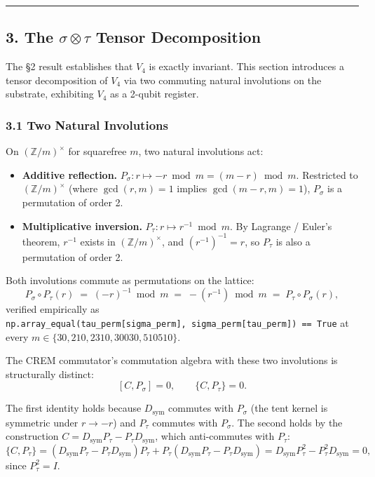 \documentclass[
]{article}
\providecommand{\tightlist}{%
  \setlength{\itemsep}{0pt}\setlength{\parskip}{0pt}}
\begin{document}
\begin{center}\rule{0.5\linewidth}{0.5pt}\end{center}

\subsection{\texorpdfstring{3. The \(\sigma\otimes\tau\) Tensor
Decomposition}{3. The \textbackslash sigma\textbackslash otimes\textbackslash tau Tensor Decomposition}}\label{the-sigmaotimestau-tensor-decomposition}

The §2 result establishes that \(V_4\) is exactly invariant. This
section introduces a tensor decomposition of \(V_4\) via two commuting
natural involutions on the substrate, exhibiting \(V_4\) as a 2-qubit
register.

\subsubsection{3.1 Two Natural
Involutions}\label{two-natural-involutions}

On \((\mathbb{Z}/m)^\times\) for squarefree \(m\), two natural
involutions act:

\begin{itemize}
\tightlist
\item
  \textbf{Additive reflection.}
  \(P_\sigma : r \mapsto -r \bmod m = (m - r) \bmod m\). Restricted to
  \((\mathbb{Z}/m)^\times\) (where \(\gcd(r, m) = 1\) implies
  \(\gcd(m-r, m) = 1\)), \(P_\sigma\) is a permutation of order 2.
\item
  \textbf{Multiplicative inversion.}
  \(P_\tau : r \mapsto r^{-1} \bmod m\). By Lagrange / Euler's theorem,
  \(r^{-1}\) exists in \((\mathbb{Z}/m)^\times\), and
  \((r^{-1})^{-1} = r\), so \(P_\tau\) is also a permutation of order 2.
\end{itemize}

Both involutions commute as permutations on the lattice:
\[P_\sigma \circ P_\tau (r) \;=\; (-r)^{-1} \bmod m \;=\; -(r^{-1}) \bmod m \;=\; P_\tau \circ P_\sigma (r), \tag{3.1}\]
verified empirically as
\texttt{np.array\_equal(tau\_perm{[}sigma\_perm{]},\ sigma\_perm{[}tau\_perm{]})\ ==\ True}
at every \(m \in \{30, 210, 2310, 30030, 510510\}\).

The CREM commutator's commutation algebra with these two involutions is
structurally distinct:
\[[C, P_\sigma] = 0, \qquad \{C, P_\tau\} = 0. \tag{3.2}\]

The first identity holds because \(D_\text{sym}\) commutes with
\(P_\sigma\) (the tent kernel is symmetric under \(r \to -r\)) and
\(P_\tau\) commutes with \(P_\sigma\). The second holds by the
construction \(C = D_\text{sym} P_\tau - P_\tau D_\text{sym}\), which
anti-commutes with \(P_\tau\):
\[\{C, P_\tau\} = (D_\text{sym} P_\tau - P_\tau D_\text{sym}) P_\tau + P_\tau (D_\text{sym} P_\tau - P_\tau D_\text{sym}) = D_\text{sym} P_\tau^2 - P_\tau^2 D_\text{sym} = 0,\]
since \(P_\tau^2 = I\).
\end{document}
